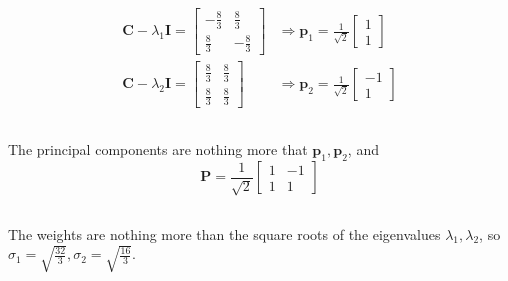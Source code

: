 \documentclass[]{article}
\begin{document}
\subsection{}

\begin{align}
	\bm{C} - \lambda_1 \bm{I} =
	\begin{bmatrix}
	-\frac{8}{3} & \frac{8}{3} \\
	\frac{8}{3} & -\frac{8}{3}
	\end{bmatrix} &\Rightarrow \bm{p}_1 =
	\frac{1}{\sqrt{2}} \begin{bmatrix}
	1 \\
	1
	\end{bmatrix} \\
	\bm{C} - \lambda_2 \bm{I} =
	\begin{bmatrix}
	\frac{8}{3} & \frac{8}{3} \\
	\frac{8}{3} & \frac{8}{3}
	\end{bmatrix} &\Rightarrow \bm{p}_2 =
	\frac{1}{\sqrt{2}} \begin{bmatrix}
	-1 \\
	1
	\end{bmatrix}
\end{align}

\subsection{}

The principal components are nothing more that \(\bm{p}_1, \bm{p}_2\), and
\begin{equation}
	\bm{P} =
	\frac{1}{\sqrt{2}} \begin{bmatrix}
	1 & -1 \\
	1 & 1
	\end{bmatrix}
\end{equation}

\subsection{}

The weights are nothing more than the square roots of the eigenvalues \(\lambda_1, \lambda_2\), so \(\sigma_1 = \sqrt{\frac{32}{3}}, \sigma_2 = \sqrt{\frac{16}{3}}\).

\subsection{}
\end{document}
